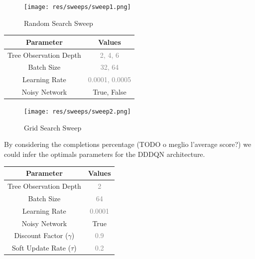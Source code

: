 \documentclass[12pt]{article}
\begin{document}
\begin{figure}[H]
        \centerline{\texttt{[image: res/sweeps/sweep1.png]}}
        \caption{Random Search Sweep}
\end{figure}

\begin{center}
\begin{tabular}{ |c|c| } 
    \hline
\textbf{Parameter} & \textbf{Values} \\ 
    \hline
\textcolor{BrickRed}{Tree Observation Depth} & \textcolor{gray}{2, 4, 6} \\ 
    \hline
\textcolor{BrickRed}{Batch Size} & \textcolor{gray}{32, 64}\\ 
    \hline
\textcolor{BrickRed}{Learning Rate} & \textcolor{gray}{0.0001, 0.0005}\\ 
    \hline
\textcolor{BrickRed}{Noisy Network} & \textcolor{OliveGreen}{True, False}\\ 
    \hline
\end{tabular}
\end{center}

\begin{figure}[H]
        \centerline{\texttt{[image: res/sweeps/sweep2.png]}}
        \caption{Grid Search Sweep}
\end{figure}

By considering the completions percentage (TODO o meglio l'average score?) we could infer the optimals parameters for the DDDQN architecture.

\begin{center}
\begin{tabular}{ |c|c| } 
    \hline
\textbf{Parameter} & \textbf{Values} \\ 
    \hline
\textcolor{BrickRed}{Tree Observation Depth} & \textcolor{gray}{2} \\ 
    \hline
\textcolor{BrickRed}{Batch Size} & \textcolor{gray}{64}\\ 
    \hline
\textcolor{BrickRed}{Learning Rate} & \textcolor{gray}{0.0001}\\ 
    \hline
\textcolor{BrickRed}{Noisy Network} & \textcolor{OliveGreen}{True}\\ 
    \hline
\textcolor{BrickRed}{Discount Factor ($\gamma$)} & \textcolor{gray}{0.9} \\ 
    \hline
\textcolor{BrickRed}{Soft Update Rate ($\tau$)} & \textcolor{gray}{0.2}\\ 
    \hline
\end{tabular}
\end{center}
\end{document}
